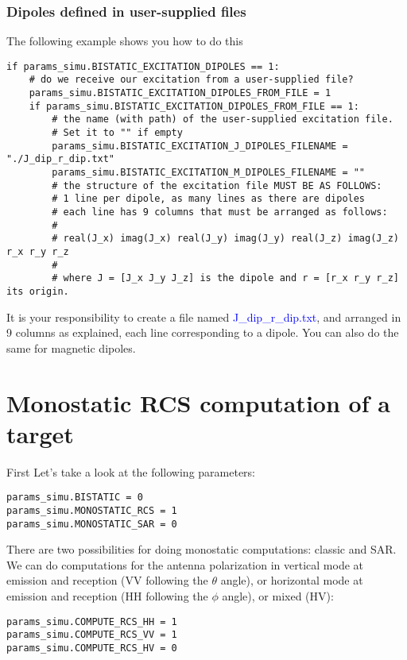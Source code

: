 \documentclass[a4paper,10pt]{book}
\newcommand{\file}[1] {\textcolor{blue}{\textsf{#1}}}
\begin{document}
\subsubsection{Dipoles defined in user-supplied files}
%
\par
The following example shows you how to do this
\begin{verbatim}
if params_simu.BISTATIC_EXCITATION_DIPOLES == 1:
    # do we receive our excitation from a user-supplied file?
    params_simu.BISTATIC_EXCITATION_DIPOLES_FROM_FILE = 1
    if params_simu.BISTATIC_EXCITATION_DIPOLES_FROM_FILE == 1:
        # the name (with path) of the user-supplied excitation file. 
        # Set it to "" if empty
        params_simu.BISTATIC_EXCITATION_J_DIPOLES_FILENAME = "./J_dip_r_dip.txt"
        params_simu.BISTATIC_EXCITATION_M_DIPOLES_FILENAME = ""
        # the structure of the excitation file MUST BE AS FOLLOWS:
        # 1 line per dipole, as many lines as there are dipoles
        # each line has 9 columns that must be arranged as follows:
        #
        # real(J_x) imag(J_x) real(J_y) imag(J_y) real(J_z) imag(J_z) r_x r_y r_z
        #
        # where J = [J_x J_y J_z] is the dipole and r = [r_x r_y r_z] its origin.
\end{verbatim}
It is your responsibility to create a file named \file{J\_dip\_r\_dip.txt}, and arranged in 9 columns as explained, each line corresponding to a dipole. You can also do the same for magnetic dipoles.


\section{Monostatic RCS computation of a target}
%
\par
First Let's take a look at the following parameters:
\begin{verbatim}
params_simu.BISTATIC = 0
params_simu.MONOSTATIC_RCS = 1
params_simu.MONOSTATIC_SAR = 0
\end{verbatim}
There are two possibilities for doing monostatic computations: classic and SAR. We can do computations for the antenna polarization in vertical mode at emission and reception (VV following the $\theta$ angle), or horizontal mode at emission and reception (HH following the $\phi$ angle), or mixed (HV):
\begin{verbatim}
params_simu.COMPUTE_RCS_HH = 1
params_simu.COMPUTE_RCS_VV = 1
params_simu.COMPUTE_RCS_HV = 0
\end{verbatim}
\end{document}
